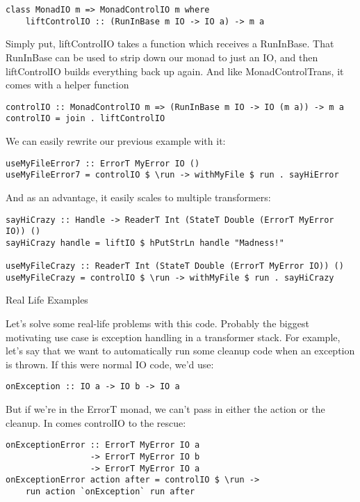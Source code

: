 \begin{lstlisting}
class MonadIO m => MonadControlIO m where
    liftControlIO :: (RunInBase m IO -> IO a) -> m a
\end{lstlisting}

Simply put, liftControlIO takes a function which receives a RunInBase. That RunInBase can be used to strip down our monad to just an IO, and then liftControlIO builds everything back up again. And like MonadControlTrans, it comes with a helper function

\begin{lstlisting}
controlIO :: MonadControlIO m => (RunInBase m IO -> IO (m a)) -> m a
controlIO = join . liftControlIO
\end{lstlisting}

We can easily rewrite our previous example with it:

\begin{lstlisting}
useMyFileError7 :: ErrorT MyError IO ()
useMyFileError7 = controlIO $ \run -> withMyFile $ run . sayHiError
\end{lstlisting}

And as an advantage, it easily scales to multiple transformers:

\begin{lstlisting}
sayHiCrazy :: Handle -> ReaderT Int (StateT Double (ErrorT MyError IO)) ()
sayHiCrazy handle = liftIO $ hPutStrLn handle "Madness!"

useMyFileCrazy :: ReaderT Int (StateT Double (ErrorT MyError IO)) ()
useMyFileCrazy = controlIO $ \run -> withMyFile $ run . sayHiCrazy
\end{lstlisting}

Real Life Examples

Let's solve some real-life problems with this code. Probably the biggest motivating use case is exception handling in a transformer stack. For example, let's say that we want to automatically run some cleanup code when an exception is thrown. If this were normal IO code, we'd use:

\begin{lstlisting}
onException :: IO a -> IO b -> IO a
\end{lstlisting}

But if we're in the ErrorT monad, we can't pass in either the action or the cleanup. In comes controlIO to the rescue:

\begin{lstlisting}
onExceptionError :: ErrorT MyError IO a
                 -> ErrorT MyError IO b
                 -> ErrorT MyError IO a
onExceptionError action after = controlIO $ \run ->
    run action `onException` run after
\end{lstlisting}

